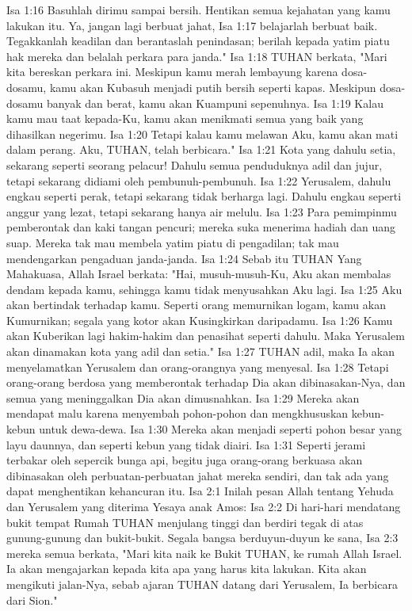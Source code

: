Isa 1:16  Basuhlah dirimu sampai bersih. Hentikan semua kejahatan yang kamu lakukan itu. Ya, jangan lagi berbuat jahat,
Isa 1:17  belajarlah berbuat baik. Tegakkanlah keadilan dan berantaslah penindasan; berilah kepada yatim piatu hak mereka dan belalah perkara para janda."
Isa 1:18  TUHAN berkata, "Mari kita bereskan perkara ini. Meskipun kamu merah lembayung karena dosa-dosamu, kamu akan Kubasuh menjadi putih bersih seperti kapas. Meskipun dosa-dosamu banyak dan berat, kamu akan Kuampuni sepenuhnya.
Isa 1:19  Kalau kamu mau taat kepada-Ku, kamu akan menikmati semua yang baik yang dihasilkan negerimu.
Isa 1:20  Tetapi kalau kamu melawan Aku, kamu akan mati dalam perang. Aku, TUHAN, telah berbicara."
Isa 1:21  Kota yang dahulu setia, sekarang seperti seorang pelacur! Dahulu semua penduduknya adil dan jujur, tetapi sekarang didiami oleh pembunuh-pembunuh.
Isa 1:22  Yerusalem, dahulu engkau seperti perak, tetapi sekarang tidak berharga lagi. Dahulu engkau seperti anggur yang lezat, tetapi sekarang hanya air melulu.
Isa 1:23  Para pemimpinmu pemberontak dan kaki tangan pencuri; mereka suka menerima hadiah dan uang suap. Mereka tak mau membela yatim piatu di pengadilan; tak mau mendengarkan pengaduan janda-janda.
Isa 1:24  Sebab itu TUHAN Yang Mahakuasa, Allah Israel berkata: "Hai, musuh-musuh-Ku, Aku akan membalas dendam kepada kamu, sehingga kamu tidak menyusahkan Aku lagi.
Isa 1:25  Aku akan bertindak terhadap kamu. Seperti orang memurnikan logam, kamu akan Kumurnikan; segala yang kotor akan Kusingkirkan daripadamu.
Isa 1:26  Kamu akan Kuberikan lagi hakim-hakim dan penasihat seperti dahulu. Maka Yerusalem akan dinamakan kota yang adil dan setia."
Isa 1:27  TUHAN adil, maka Ia akan menyelamatkan Yerusalem dan orang-orangnya yang menyesal.
Isa 1:28  Tetapi orang-orang berdosa yang memberontak terhadap Dia akan dibinasakan-Nya, dan semua yang meninggalkan Dia akan dimusnahkan.
Isa 1:29  Mereka akan mendapat malu karena menyembah pohon-pohon dan mengkhususkan kebun-kebun untuk dewa-dewa.
Isa 1:30  Mereka akan menjadi seperti pohon besar yang layu daunnya, dan seperti kebun yang tidak diairi.
Isa 1:31  Seperti jerami terbakar oleh sepercik bunga api, begitu juga orang-orang berkuasa akan dibinasakan oleh perbuatan-perbuatan jahat mereka sendiri, dan tak ada yang dapat menghentikan kehancuran itu.
Isa 2:1  Inilah pesan Allah tentang Yehuda dan Yerusalem yang diterima Yesaya anak Amos:
Isa 2:2  Di hari-hari mendatang bukit tempat Rumah TUHAN menjulang tinggi dan berdiri tegak di atas gunung-gunung dan bukit-bukit. Segala bangsa berduyun-duyun ke sana,
Isa 2:3  mereka semua berkata, "Mari kita naik ke Bukit TUHAN, ke rumah Allah Israel. Ia akan mengajarkan kepada kita apa yang harus kita lakukan. Kita akan mengikuti jalan-Nya, sebab ajaran TUHAN datang dari Yerusalem, Ia berbicara dari Sion."
